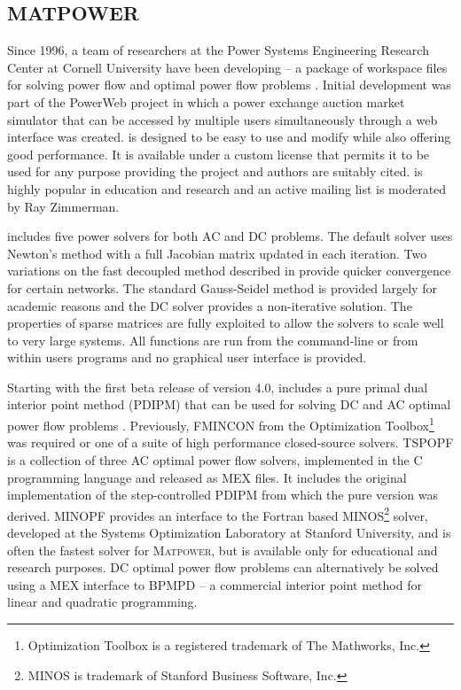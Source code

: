 \subsection{MATPOWER}
Since 1996, a team of researchers at the Power Systems Engineering Research
Center at Cornell University have been developing \matpower -- a package of
\matlab workspace files for solving power flow and optimal power flow problems
\cite{zimmerman:mp_pes}. Initial development was part of the PowerWeb project
in which a power exchange auction market simulator that can be accessed by multiple users
simultaneously through a web interface was created.  \matpower is designed to
be easy to use and modify while also offering good performance.  It is available under a
custom license that permits it to be used for any purpose providing the project
and authors are suitably cited.  \matpower is highly popular in education and
research and an active mailing list is moderated by Ray Zimmerman.

\matpower includes five power solvers for both AC and DC problems.  The default
solver uses Newton's method \cite{tinney:67} with a full Jacobian matrix
updated in each iteration.  Two variations on the fast decoupled method
\cite{stott:74} described in \cite{amerongen:89} provide quicker convergence
for certain networks.  The standard Gauss-Seidel method \cite{glimn:57} is provided
largely for academic reasons and the DC solver provides a non-iterative
solution.  The properties of \matlab sparse matrices are fully exploited to
allow the solvers to scale well to very large systems.  All functions are run
from the \matlab command-line or from within users programs and no graphical
user interface is provided.

Starting with the first beta release of version 4.0, \matpower includes a pure
\matlab primal dual interior point method (PDIPM) that can be used for solving
DC and AC optimal power flow problems \cite{zimmerman:ccv}.  Previously,
FMINCON from the \matlab Optimization Toolbox\footnote{Optimization
Toolbox is a registered trademark of The Mathworks, Inc.} was required or one
of a suite of high performance closed-source solvers.  TSPOPF is a
collection of three AC optimal power flow solvers, implemented in the C
programming language and released as \matlab MEX files.  It includes
the original implementation of the step-controlled PDIPM from which the pure
\matlab version was derived.  MINOPF provides an interface to the
Fortran based MINOS\footnote{MINOS is trademark of Stanford
Business Software, Inc.} solver, developed at the Systems Optimization
Laboratory at Stanford University, and is often the fastest solver for
\textsc{Matpower}, but is available only for educational and research purposes.
DC optimal power flow problems can alternatively be solved using a MEX
interface to BPMPD -- a commercial interior point method for linear
and quadratic programming.

